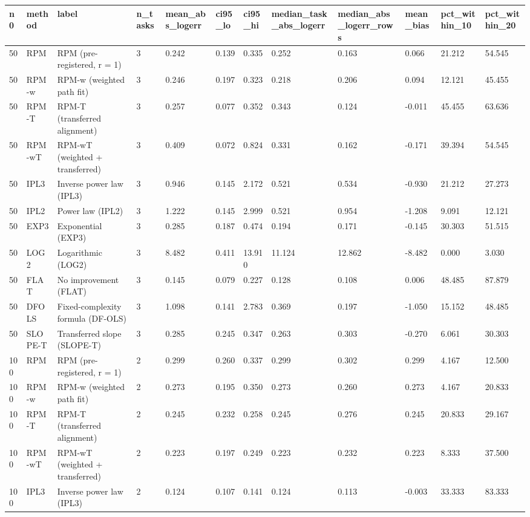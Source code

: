 \begin{tabular}{llllllllllll}
\hline
n0 & method & label & n\_tasks & mean\_abs\_logerr & ci95\_lo & ci95\_hi & median\_task\_abs\_logerr & median\_abs\_logerr\_rows & mean\_bias & pct\_within\_10 & pct\_within\_20 \\
\hline
50 & RPM & RPM (pre-registered, r = 1) & 3 & 0.242 & 0.139 & 0.335 & 0.252 & 0.163 & 0.066 & 21.212 & 54.545 \\
50 & RPM-w & RPM-w (weighted path fit) & 3 & 0.246 & 0.197 & 0.323 & 0.218 & 0.206 & 0.094 & 12.121 & 45.455 \\
50 & RPM-T & RPM-T (transferred alignment) & 3 & 0.257 & 0.077 & 0.352 & 0.343 & 0.124 & -0.011 & 45.455 & 63.636 \\
50 & RPM-wT & RPM-wT (weighted + transferred) & 3 & 0.409 & 0.072 & 0.824 & 0.331 & 0.162 & -0.171 & 39.394 & 54.545 \\
50 & IPL3 & Inverse power law (IPL3) & 3 & 0.946 & 0.145 & 2.172 & 0.521 & 0.534 & -0.930 & 21.212 & 27.273 \\
50 & IPL2 & Power law (IPL2) & 3 & 1.222 & 0.145 & 2.999 & 0.521 & 0.954 & -1.208 & 9.091 & 12.121 \\
50 & EXP3 & Exponential (EXP3) & 3 & 0.285 & 0.187 & 0.474 & 0.194 & 0.171 & -0.145 & 30.303 & 51.515 \\
50 & LOG2 & Logarithmic (LOG2) & 3 & 8.482 & 0.411 & 13.910 & 11.124 & 12.862 & -8.482 & 0.000 & 3.030 \\
50 & FLAT & No improvement (FLAT) & 3 & 0.145 & 0.079 & 0.227 & 0.128 & 0.108 & 0.006 & 48.485 & 87.879 \\
50 & DFOLS & Fixed-complexity formula (DF-OLS) & 3 & 1.098 & 0.141 & 2.783 & 0.369 & 0.197 & -1.050 & 15.152 & 48.485 \\
50 & SLOPE-T & Transferred slope (SLOPE-T) & 3 & 0.285 & 0.245 & 0.347 & 0.263 & 0.303 & -0.270 & 6.061 & 30.303 \\
100 & RPM & RPM (pre-registered, r = 1) & 2 & 0.299 & 0.260 & 0.337 & 0.299 & 0.302 & 0.299 & 4.167 & 12.500 \\
100 & RPM-w & RPM-w (weighted path fit) & 2 & 0.273 & 0.195 & 0.350 & 0.273 & 0.260 & 0.273 & 4.167 & 20.833 \\
100 & RPM-T & RPM-T (transferred alignment) & 2 & 0.245 & 0.232 & 0.258 & 0.245 & 0.276 & 0.245 & 20.833 & 29.167 \\
100 & RPM-wT & RPM-wT (weighted + transferred) & 2 & 0.223 & 0.197 & 0.249 & 0.223 & 0.232 & 0.223 & 8.333 & 37.500 \\
100 & IPL3 & Inverse power law (IPL3) & 2 & 0.124 & 0.107 & 0.141 & 0.124 & 0.113 & -0.003 & 33.333 & 83.333 \\

\end{tabular}
